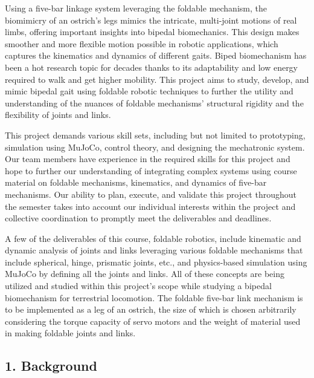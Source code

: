 \documentclass[12pt]{article}
\begin{document}
Using a five-bar linkage system leveraging the foldable mechanism, the biomimicry of an ostrich's legs mimics the intricate, multi-joint motions of real limbs, offering important insights into bipedal biomechanics. This design makes smoother and more flexible motion possible in robotic applications, which captures the kinematics and dynamics of different gaits. Biped biomechanism has been a hot research topic for decades thanks to its adaptability and low energy required to walk and get higher mobility. This project aims to study, develop, and mimic bipedal gait using foldable robotic techniques to further the utility and understanding of the nuances of foldable mechanisms’ structural rigidity and the flexibility of joints and links.

This project demands various skill sets, including but not limited to prototyping, simulation using MuJoCo, control theory, and designing the mechatronic system. Our team members have experience in the required skills for this project and hope to further our understanding of integrating complex systems using course material on foldable mechanisms, kinematics, and dynamics of five-bar mechanisms. Our ability to plan, execute, and validate this project throughout the semester takes into account our individual interests within the project and collective coordination to promptly meet the deliverables and deadlines.

A few of the deliverables of this course, foldable robotics, include kinematic and dynamic analysis of joints and links leveraging various foldable mechanisms that include spherical, hinge, prismatic joints, etc., and physics-based simulation using MuJoCo by defining all the joints and links. All of these concepts are being utilized and studied within this project's scope while studying a bipedal biomechanism for terrestrial locomotion. The foldable five-bar link mechanism is to be implemented as a leg of an ostrich, the size of which is chosen arbitrarily considering the torque capacity of servo motors and the weight of material used in making foldable joints and links.



\subsection*{1. Background}
\end{document}
